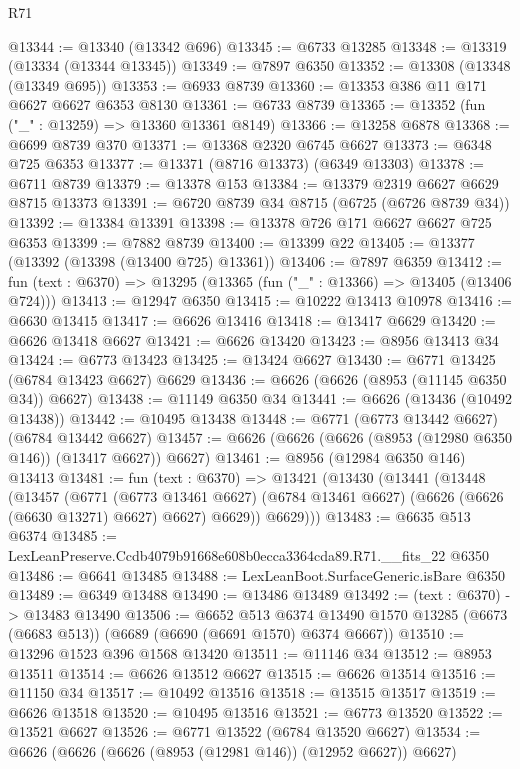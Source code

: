 \begin{lexlean}{R71}
\begin{coremodule}
@13344 := @13340 (@13342 @696)
@13345 := @6733 @13285
@13348 := @13319 (@13334 (@13344 @13345))
@13349 := @7897 @6350
@13352 := @13308 (@13348 (@13349 @695))
@13353 := @6933 @8739
@13360 := @13353 @386 @11 @171 @6627 @6627 @6353 @8130
@13361 := @6733 @8739
@13365 := @13352 (fun ("_" : @13259) => @13360 @13361 @8149)
@13366 := @13258 @6878
@13368 := @6699 @8739 @370
@13371 := @13368 @2320 @6745 @6627
@13373 := @6348 @725 @6353
@13377 := @13371 (@8716 @13373) (@6349 @13303)
@13378 := @6711 @8739
@13379 := @13378 @153
@13384 := @13379 @2319 @6627 @6629 @8715 @13373
@13391 := @6720 @8739 @34 @8715 (@6725 (@6726 @8739 @34))
@13392 := @13384 @13391
@13398 := @13378 @726 @171 @6627 @6627 @725 @6353
@13399 := @7882 @8739
@13400 := @13399 @22
@13405 := @13377 (@13392 (@13398 (@13400 @725) @13361))
@13406 := @7897 @6359
@13412 := fun (text : @6370) => @13295 (@13365 (fun ("_" : @13366) => @13405 (@13406 @724)))
@13413 := @12947 @6350
@13415 := @10222 @13413 @10978
@13416 := @6630 @13415
@13417 := @6626 @13416
@13418 := @13417 @6629
@13420 := @6626 @13418 @6627
@13421 := @6626 @13420
@13423 := @8956 @13413 @34
@13424 := @6773 @13423
@13425 := @13424 @6627
@13430 := @6771 @13425 (@6784 @13423 @6627) @6629
@13436 := @6626 (@6626 (@8953 (@11145 @6350 @34)) @6627)
@13438 := @11149 @6350 @34
@13441 := @6626 (@13436 (@10492 @13438))
@13442 := @10495 @13438
@13448 := @6771 (@6773 @13442 @6627) (@6784 @13442 @6627)
@13457 := @6626 (@6626 (@6626 (@8953 (@12980 @6350 @146)) (@13417 @6627)) @6627)
@13461 := @8956 (@12984 @6350 @146) @13413
@13481 := fun (text : @6370) =>
  @13421
    (@13430
      (@13441
        (@13448
          (@13457
            (@6771
              (@6773 @13461 @6627)
              (@6784 @13461 @6627)
              (@6626 (@6626 (@6630 @13271) @6627) @6627)
              @6629))
          @6629)))
@13483 := @6635 @513 @6374
@13485 := LexLeanPreserve.Ccdb4079b91668e608b0ecca3364cda89.R71.__fits_22 @6350
@13486 := @6641 @13485
@13488 := LexLeanBoot.SurfaceGeneric.isBare @6350
@13489 := @6349 @13488
@13490 := @13486 @13489
@13492 := (text : @6370) -> @13483 @13490
@13506 := @6652
    @513
    @6374
    @13490
    @1570
    @13285
    (@6673 (@6683 @513))
    (@6689 (@6690 (@6691 @1570) @6374 @6667))
@13510 := @13296 @1523 @396 @1568 @13420
@13511 := @11146 @34
@13512 := @8953 @13511
@13514 := @6626 @13512 @6627
@13515 := @6626 @13514
@13516 := @11150 @34
@13517 := @10492 @13516
@13518 := @13515 @13517
@13519 := @6626 @13518
@13520 := @10495 @13516
@13521 := @6773 @13520
@13522 := @13521 @6627
@13526 := @6771 @13522 (@6784 @13520 @6627)
@13534 := @6626 (@6626 (@6626 (@8953 (@12981 @146)) (@12952 @6627)) @6627)

\end{coremodule}
\end{lexlean}
